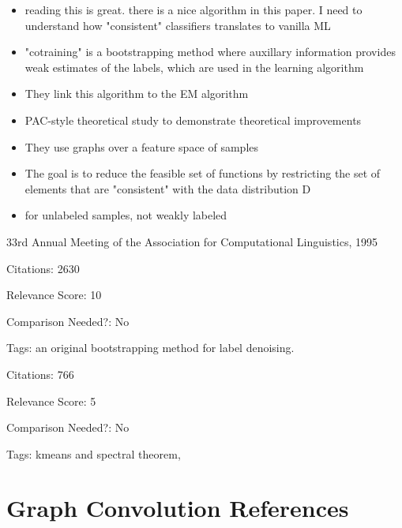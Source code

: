 \documentclass[11pt]{article}
\begin{document}
\begin{itemize}
\item reading this is great. there is a nice algorithm in this paper. I need to understand how "consistent" classifiers translates to vanilla ML
\item "cotraining" is a bootstrapping method where auxillary information provides weak estimates of the labels, which are used in the learning algorithm
\item They link this algorithm to the EM algorithm
\item PAC-style theoretical study to demonstrate theoretical improvements
\item They use graphs over a feature space of samples
\item The goal is to reduce the feasible set of functions by restricting the set of elements that are "consistent" with the data distribution D
\item for unlabeled samples, not weakly labeled
\end{itemize}

\vspace{2cm} 

\noindent 33rd Annual Meeting of the Association for Computational Linguistics, 1995

\noindent Citations: 2630

\noindent Relevance Score: 10

\noindent Comparison Needed?: No

\noindent Tags: an original bootstrapping method for label denoising. 


\vspace{2cm} 



\noindent Citations: 766

\noindent Relevance Score: 5

\noindent Comparison Needed?: No

\noindent Tags: kmeans and spectral theorem,


\section{Graph Convolution References}




\vspace{2cm} 
\end{document}
